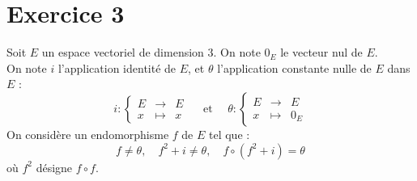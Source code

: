 \documentclass[11pt]{article}%
\begin{document}
\section*{Exercice 3}

\noindent
Soit $E$ un espace vectoriel de dimension 3. On note $0_E$ le vecteur
nul de $E$.\\
On note $i$ l'application identité de $E$, et $\theta$ l'application
constante nulle de $E$ dans $E$ :
\[
 i : \left\{
 \begin{array}{rcl}
  E & \to & E\\
  x & \mapsto & x
 \end{array}
 \right.
 \quad \mbox{ et } \quad 
 \theta : \left\{
 \begin{array}{rcl}
  E & \to & E\\
  x & \mapsto & 0_E
 \end{array}
 \right.
\]
On considère un endomorphisme $f$ de $E$ tel que : 
\[
 f \neq \theta, \quad f^2 + i \neq \theta, \quad f \circ (f^2+i)=\theta
\]
où $f^2$ désigne $f \circ f$.
\end{document}
